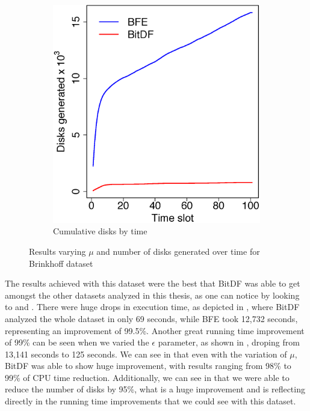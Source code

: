 {\begin{figure}[h!]
\begin{subfigure}[t]{0.48\textwidth}
        \includegraphics[width=\textwidth]{images/Brinkhoff_d.eps}
        \caption{Cumulative disks by time}
        \label{fig:brinkhoff_disks}
    \end{subfigure}
    \caption{Results varying $\mu$ and number of disks generated over time for Brinkhoff dataset}
    \label{fig:brinkhoff_results2}
\end{figure}

The results achieved with this dataset were the best that BitDF was able to get amongst the other datasets analyzed in
this thesis, as one can notice by looking to  and . There
were huge drops in execution time, as depicted in , where BitDF analyzed the whole dataset
in only 69 seconds, while BFE took 12,732 seconds, representing an improvement of 99.5\%. Another great running time
improvement of 99\% can be seen when we varied the $\epsilon$ parameter, as shown in ,
droping from 13,141 seconds to 125 seconds. We can see in  that even with the variation of
$\mu$, BitDF was able to show huge improvement, with results ranging from 98\% to 99\% of CPU time reduction.
Additionally, we can see in  that we were able to reduce the number of disks by 95\%, what
is a huge improvement and is reflecting directly in the running time improvements that we could see with this dataset.

}
